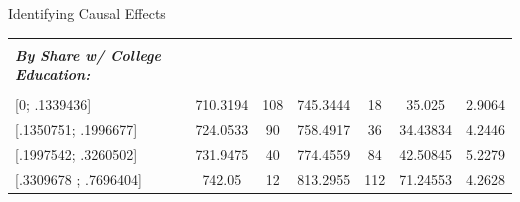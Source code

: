 \documentclass[notes,10pt, aspectratio=169]{beamer}
\begin{document}
\begin{frame}{Identifying Causal Effects}
\begin{center}
{\begin{table}[]
\begin{tabular}{l|cc|cc|cc|}
            \multicolumn{1}{|l|}{} &                                                                &                                &                                                                &                                & \multicolumn{1}{c|}{}                                             &                      \\
            \multicolumn{1}{|l|}{\textbf{\textit{By Share w/ College Education:}}} &                                                                &                                &                                                                &                                & \multicolumn{1}{c|}{}                                             &                      \\
            \multicolumn{1}{|l|}{} &                                                                &                                &                                                                &                                & \multicolumn{1}{c|}{}                                             &                      \\
            \multicolumn{1}{|l|}{{[}0; .1339436{]}}                       & 710.3194                                                       & 108                            & 745.3444                                                       & 18                             & \multicolumn{1}{c|}{35.025}                                       & 2.9064               \\
            \multicolumn{1}{|l|}{{[}.1350751; .1996677{]}}                & 724.0533                                                       & 90                             & 758.4917                                                       & 36                             & \multicolumn{1}{c|}{34.43834}                                     & 4.2446               \\
            \multicolumn{1}{|l|}{{[}.1997542; .3260502{]}}                & 731.9475                                                       & 40                             & 774.4559                                                       & 84                             & \multicolumn{1}{c|}{42.50845}                                     & 5.2279               \\
            \multicolumn{1}{|l|}{{[}.3309678 ; .7696404{]}}               & 742.05                                                         & 12                             & 813.2955                                                       & 112                            & \multicolumn{1}{c|}{71.24553}                                     & 4.2628               \\ \hline
            \end{tabular}
            \end{table}
            
}

\end{center}

\end{frame}
\end{document}
